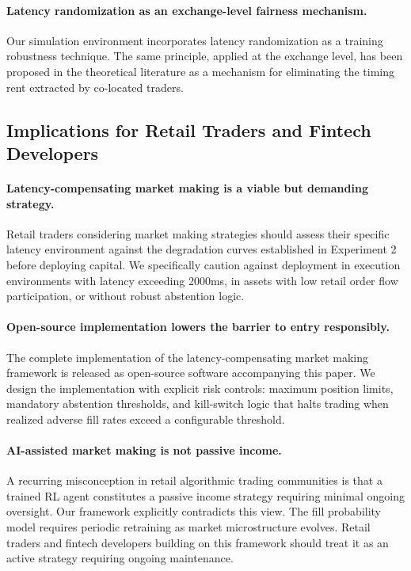 \documentclass[12pt]{article}
\begin{document}
\paragraph{Latency randomization as an exchange-level fairness mechanism.} Our simulation environment incorporates latency randomization as a training robustness technique. The same principle, applied at the exchange level, has been proposed in the theoretical literature \citep{barzykin2026} as a mechanism for eliminating the timing rent extracted by co-located traders.

\subsection{Implications for Retail Traders and Fintech Developers}

\paragraph{Latency-compensating market making is a viable but demanding strategy.} Retail traders considering market making strategies should assess their specific latency environment against the degradation curves established in Experiment 2 before deploying capital. We specifically caution against deployment in execution environments with latency exceeding 2000ms, in assets with low retail order flow participation, or without robust abstention logic.

\paragraph{Open-source implementation lowers the barrier to entry responsibly.} The complete implementation of the latency-compensating market making framework is released as open-source software accompanying this paper. We design the implementation with explicit risk controls: maximum position limits, mandatory abstention thresholds, and kill-switch logic that halts trading when realized adverse fill rates exceed a configurable threshold.

\paragraph{AI-assisted market making is not passive income.} A recurring misconception in retail algorithmic trading communities is that a trained RL agent constitutes a passive income strategy requiring minimal ongoing oversight. Our framework explicitly contradicts this view. The fill probability model requires periodic retraining as market microstructure evolves. Retail traders and fintech developers building on this framework should treat it as an active strategy requiring ongoing maintenance.
\end{document}
